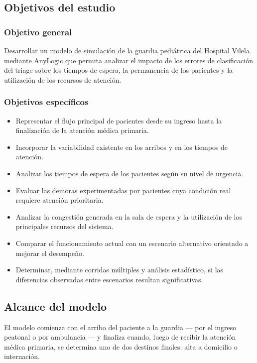 \documentclass{article}
\begin{document}
\subsection{Objetivos del estudio}

\subsubsection*{Objetivo general}

Desarrollar un modelo de simulación de la guardia pediátrica del Hospital
Vilela mediante AnyLogic que permita analizar el impacto de los errores de
clasificación del triage sobre los tiempos de espera, la permanencia de los
pacientes y la utilización de los recursos de atención.

\subsubsection*{Objetivos específicos}

\begin{itemize}
  \item Representar el flujo principal de pacientes desde su ingreso hasta la
  finalización de la atención médica primaria.
  \item Incorporar la variabilidad existente en los arribos y en los tiempos
  de atención.
  \item Analizar los tiempos de espera de los pacientes según su nivel de
  urgencia.
  \item Evaluar las demoras experimentadas por pacientes cuya condición real
  requiere atención prioritaria.
  \item Analizar la congestión generada en la sala de espera y la utilización
  de los principales recursos del sistema.
  \item Comparar el funcionamiento actual con un escenario alternativo
  orientado a mejorar el desempeño.
  \item Determinar, mediante corridas múltiples y análisis estadístico, si las
  diferencias observadas entre escenarios resultan significativas.
\end{itemize}

\subsection{Alcance del modelo}

El modelo comienza con el arribo del paciente a la guardia --- por el ingreso
peatonal o por ambulancia --- y finaliza cuando, luego de recibir la atención
médica primaria, se determina uno de dos destinos finales: alta a domicilio
o internación.
\end{document}

